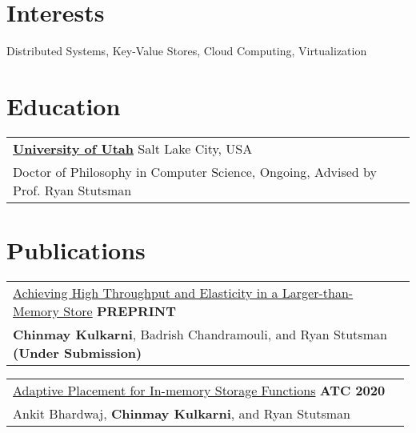 \documentclass[margin,line]{res}
\begin{document}
\name{Chinmay Kulkarni (chinmayk@cs.utah.edu, www.chinmayk.net) %
}
\begin{resume}

\section{\sc Interests}
Distributed Systems, Key-Value Stores, Cloud Computing, Virtualization

\section{\sc Education}
 \begin{tabular}{@{}p{5.5in}p{4in}}
  {\bf \href{http://www.cs.utah.edu/}{University of Utah}} \dotfill Salt Lake City,
  USA \\
 {\small Doctor of Philosophy in Computer Science, Ongoing, Advised by Prof. Ryan Stutsman}
 \end{tabular}

\section{\sc Publications}
 \begin{tabular}{@{}p{5.5in}p{4in}}
 \href{https://arxiv.org/abs/2006.03206}{Achieving High Throughput and
 Elasticity in a Larger-than-Memory Store} \hfill
 {\small\bf PREPRINT}\\
 {\small {\bf Chinmay Kulkarni}, Badrish Chandramouli, and Ryan
 Stutsman} \hfill {\small\bf (Under Submission)}\\
 \end{tabular}

 \vspace{-7pt}
 \begin{tabular}{@{}p{5.5in}p{4in}}
 \href{http://utah.systems/projects/kulkarni\_splinter}{Adaptive
 Placement for In-memory Storage Functions} \hfill
 {\small\bf ATC 2020}\\
 {\small Ankit Bhardwaj, {\bf Chinmay Kulkarni}, and Ryan Stutsman}\\
 \end{tabular}


\end{resume}
\end{document}
